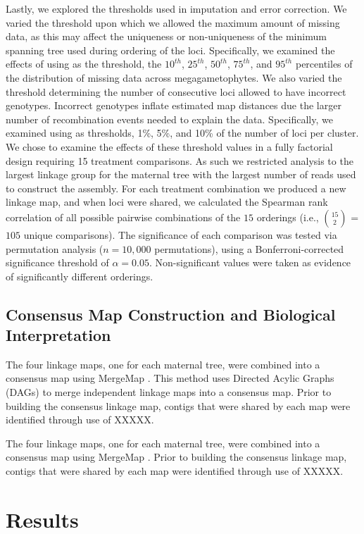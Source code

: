 \documentclass[11pt]{article}
\begin{document}
Lastly, we explored the thresholds used in imputation and error correction. We varied the threshold upon which
we allowed the maximum amount of missing data, as this may affect the uniqueness 
or non-uniqueness of the minimum spanning tree used during ordering of the loci. Specifically,
we examined the effects of using as the threshold, the $10^{th}$, $25^{th}$, $50^{th}$, $75^{th}$, and $95^{th}$ percentiles of
the distribution of missing data across megagametophytes. We also varied the threshold determining 
the number of consecutive loci allowed to have incorrect genotypes. Incorrect genotypes inflate estimated
map distances due the larger number of recombination events needed to explain the data. Specifically, we
examined using as thresholds, 1\%, 5\%, and 10\% of the number of loci per cluster. We chose to examine the 
effects of these threshold values in a fully factorial design requiring 15 treatment comparisons. As such we restricted
analysis to the largest linkage group for the maternal tree with the largest number of reads used to construct
the assembly. For each treatment combination we produced a new linkage map, and when loci were shared, we calculated
the Spearman rank correlation of all possible pairwise combinations of the $15$ orderings (i.e., {$15 \choose 2$} = $105$ unique
comparisons). The significance of each comparison was tested via permutation analysis ($n = 10,000$ permutations), 
using a Bonferroni-corrected significance threshold of $\alpha = 0.05$. Non-significant values were taken as evidence of significantly different orderings.

\subsection*{Consensus Map Construction and Biological Interpretation}\label{ss:map}
The four linkage maps, one for each maternal tree, were combined into a consensus map using MergeMap \citep{Wu:2008b}. This
method uses Directed Acylic Graphs (DAGs) to merge independent linkage maps into a consensus map. Prior to building the consensus 
linkage map, contigs that were shared by each map were identified through use of XXXXX.

The four linkage maps, one for each maternal tree, were combined into a consensus map using MergeMap \citep{Wu:2008b}. Prior to 
building the consensus linkage map, contigs that were shared by each map were identified through use of XXXXX.

\section*{Results}
\end{document}
